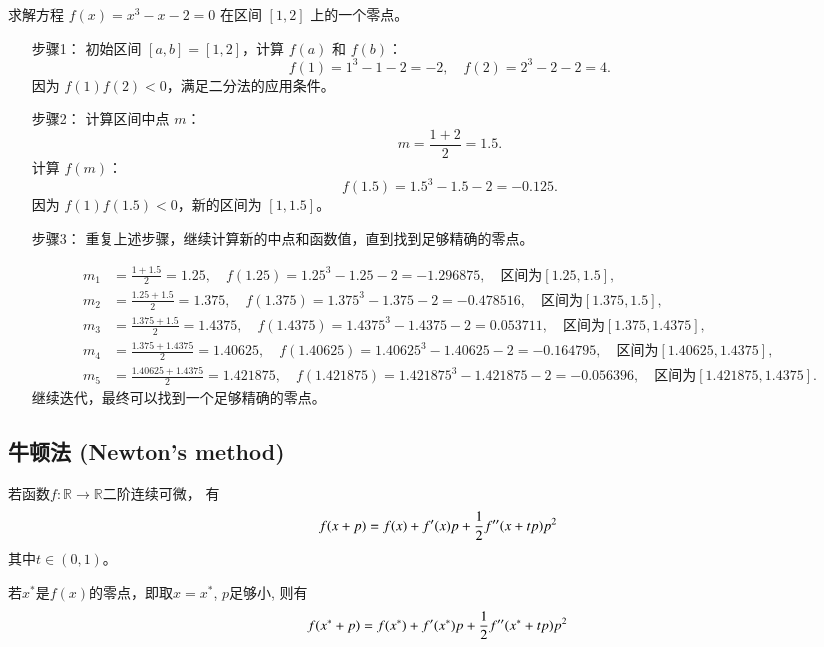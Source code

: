 \begin{example}
    求解方程 $f(x) = x^3 - x - 2 = 0$ 在区间 $[1, 2]$ 上的一个零点。
\begin{solution}
\begin{enumerate}
    \item[步骤1：] 初始区间 $[a, b] = [1, 2]$，计算 $f(a)$ 和 $f(b)$：
    \[
    f(1) = 1^3 - 1 - 2 = -2, \quad f(2) = 2^3 - 2 - 2 = 4.
    \]
    因为 $f(1)f(2) < 0$，满足二分法的应用条件。
    \item[步骤2：] 计算区间中点 $m$：
    \[
    m = \frac{1 + 2}{2} = 1.5.
    \]
    计算 $f(m)$：
    \[
    f(1.5) = 1.5^3 - 1.5 - 2 = -0.125.
    \]
    因为 $f(1)f(1.5) < 0$，新的区间为 $[1, 1.5]$。
    \item[步骤3：] 重复上述步骤，继续计算新的中点和函数值，直到找到足够精确的零点。

    \[
    \begin{aligned}
    m_1 &= \frac{1 + 1.5}{2} = 1.25, \quad f(1.25) = 1.25^3 - 1.25 - 2 = -1.296875, \quad \text{区间为} [1.25, 1.5], \\
    m_2 &= \frac{1.25 + 1.5}{2} = 1.375, \quad f(1.375) = 1.375^3 - 1.375 - 2 = -0.478516, \quad \text{区间为} [1.375, 1.5], \\
    m_3 &= \frac{1.375 + 1.5}{2} = 1.4375, \quad f(1.4375) = 1.4375^3 - 1.4375 - 2 = 0.053711, \quad \text{区间为} [1.375, 1.4375], \\
    m_4 &= \frac{1.375 + 1.4375}{2} = 1.40625, \quad f(1.40625) = 1.40625^3 - 1.40625 - 2 = -0.164795, \quad \text{区间为} [1.40625, 1.4375], \\
    m_5 &= \frac{1.40625 + 1.4375}{2} = 1.421875, \quad f(1.421875) = 1.421875^3 - 1.421875 - 2 = -0.056396, \quad \text{区间为} [1.421875, 1.4375].
    \end{aligned}
    \]
    继续迭代，最终可以找到一个足够精确的零点。
\end{enumerate}
\end{solution}

\end{example}

\subsection{牛顿法 (Newton's method)}
\label{sub:newton_method}

\begin{theorem}
    若函数$f:\mathbb{R} \to \mathbb{R}$二阶连续可微，
    有
    \begin{equation}
        f(x+p) = f(x) + f'(x) p + {\frac{1}{2}} f''(x + t p) p^2
    \end{equation}
    其中$t\in (0,1)$。
\end{theorem}
若$x^*$是$f(x)$的零点，即取$x=x^*$, $p$足够小, 则有
$$
f(x^*+p) = f(x^*) + f'(x^*) p + {\frac{1}{2}} f''(x^* + t p) p^2
$$



